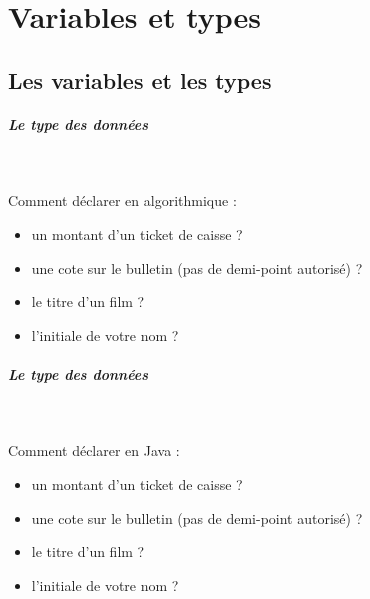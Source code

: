 \documentclass[11pt,a4paper]{article}
\begin{document}
            \section{Variables et types}\subsection{Les variables et les types}
			
		\subparagraph{Le type des donn\'ees} 
		
                \textcolor{white}{.} \par
             
								Comment d\'eclarer en algorithmique :
							
					\begin{itemize}
				
			\item un montant d'un ticket de caisse ?  \textcolor{gray}{\underline{\hspace*{10em}}} 
			\item une cote sur le bulletin (pas de demi-point autoris\'e) ?  \textcolor{gray}{\underline{\hspace*{10em}}} 
			\item le titre d'un film ? \textcolor{gray}{\underline{\hspace*{10em}}} 
			\item l'initiale de votre nom ? \textcolor{gray}{\underline{\hspace*{10em}}} 
					\end{itemize}
				
			
		\subparagraph{Le type des donn\'ees} 
		
                \textcolor{white}{.} \par
             
								Comment d\'eclarer en Java :
							
					\begin{itemize}
				
			\item un montant d'un ticket de caisse ?  \textcolor{gray}{\underline{\hspace*{10em}}} 
			\item une cote sur le bulletin (pas de demi-point autoris\'e) ?  \textcolor{gray}{\underline{\hspace*{10em}}} 
			\item le titre d'un film ? \textcolor{gray}{\underline{\hspace*{10em}}} 
			\item l'initiale de votre nom ? \textcolor{gray}{\underline{\hspace*{10em}}} 
					\end{itemize}
				
\end{document}
